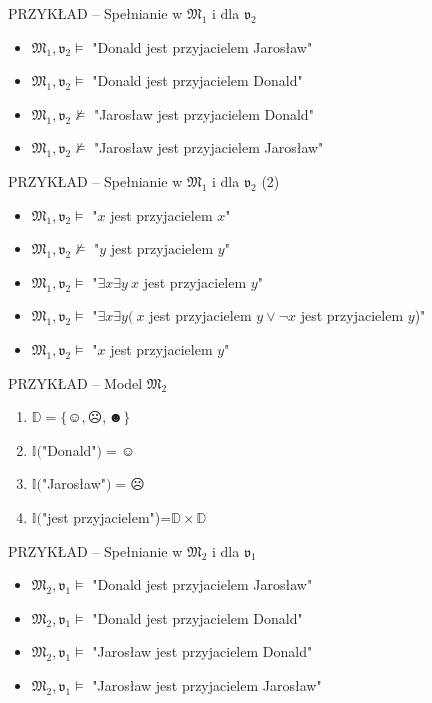 \documentclass{beamer}
\begin{document}
\begin{frame}{PRZYKŁAD -- Spełnianie w $\mathfrak{M}_1$ i dla $\mathfrak{v}_2$}
%
\begin{itemize}
\item $\mathfrak{M}_1,\mathfrak{v}_2 \vDash$ "Donald jest przyjacielem Jarosław"%
\item $\mathfrak{M}_1,\mathfrak{v}_2 \vDash$ "Donald jest przyjacielem Donald"%
\item $\mathfrak{M}_1,\mathfrak{v}_2 \not \vDash$ "Jarosław jest przyjacielem Donald"%
\item $\mathfrak{M}_1,\mathfrak{v}_2 \not \vDash$ "Jarosław jest przyjacielem Jarosław"
\end{itemize}
\end{frame}

\begin{frame}{PRZYKŁAD -- Spełnianie w $\mathfrak{M}_1$ i dla $\mathfrak{v}_2$ (2)}
%
\begin{itemize}
\item $\mathfrak{M}_1,\mathfrak{v}_2 \vDash$ "$x$ jest przyjacielem $x$"%
\item $\mathfrak{M}_1,\mathfrak{v}_2 \not \vDash$ "$y$ jest przyjacielem $y$"%
\item $\mathfrak{M}_1,\mathfrak{v}_2 \vDash$ "$\exists x \exists y ~x$ jest przyjacielem $y$"%
\item $\mathfrak{M}_1,\mathfrak{v}_2 \vDash$ "$\exists x \exists y ( ~x$ jest przyjacielem $y \lor \neg x$ jest przyjacielem $y$)"%
\item $\mathfrak{M}_1,\mathfrak{v}_2 \vDash$ "$x$ jest przyjacielem $y$"
\end{itemize}
\end{frame}

\begin{frame}{PRZYKŁAD -- Model $\mathfrak{M}_2$}
%
\begin{enumerate}
    \item $\mathbb{D} = \{\smiley{}, \frownie{}, \blacksmiley{} \}$%
    \item $\mathbb{I}($"Donald"$)=\smiley{}$%
    \item $\mathbb{I}($"Jarosław"$)=\frownie{}$%
    \item $\mathbb{I}($"jest przyjacielem")=$\mathbb{D} \times \mathbb{D}$
\end{enumerate}
\end{frame}

\begin{frame}{PRZYKŁAD -- Spełnianie w $\mathfrak{M}_2$ i dla $\mathfrak{v}_1$}
%
\begin{itemize}
\item $\mathfrak{M}_2,\mathfrak{v}_1 \vDash$ "Donald jest przyjacielem Jarosław"%
\item $\mathfrak{M}_2,\mathfrak{v}_1 \vDash$ "Donald jest przyjacielem Donald"%
\item $\mathfrak{M}_2,\mathfrak{v}_1 \vDash$ "Jarosław jest przyjacielem Donald"%
\item $\mathfrak{M}_2,\mathfrak{v}_1 \vDash$ "Jarosław jest przyjacielem Jarosław"
\end{itemize}
\end{frame}
\end{document}
